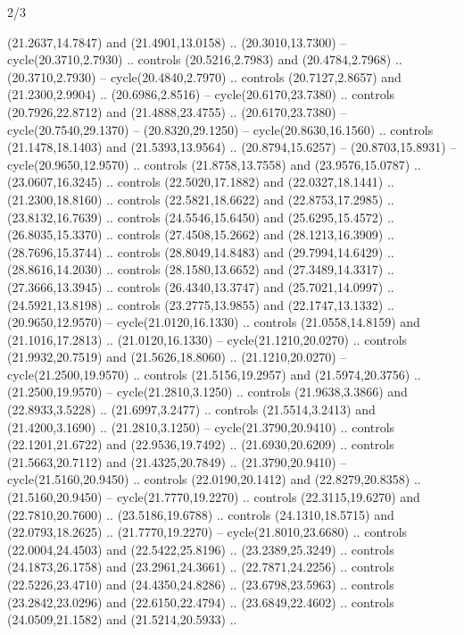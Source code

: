 \begin{flagdescription}{2/3}
\begin{scope}[yshift=\flagwidth,scale=\flagwidth/1241.93737]
\begin{scope}[y=-1mm, x=1mm,draw=gold,fill=blue,line join=miter,miter limit=4,line width=1.8\lw]
\begin{scope}[y=1mm, x=1mm, yscale=-1,shift={(573.68mm+\str,145.75)}]
\begin{scope}[scale=1.35,shift={(-9,-3)}]
\begin{scope}[scale=0.55]
\begin{scope}[scale=1.333]
    (21.2637,14.7847) and (21.4901,13.0158) .. (20.3010,13.7300) --
    cycle(20.3710,2.7930) .. controls (20.5216,2.7983) and (20.4784,2.7968) ..
    (20.3710,2.7930) -- cycle(20.4840,2.7970) .. controls (20.7127,2.8657) and
    (21.2300,2.9904) .. (20.6986,2.8516) -- cycle(20.6170,23.7380) .. controls
    (20.7926,22.8712) and (21.4888,23.4755) .. (20.6170,23.7380) --
    cycle(20.7540,29.1370) -- (20.8320,29.1250) -- cycle(20.8630,16.1560) ..
    controls (21.1478,18.1403) and (21.5393,13.9564) .. (20.8794,15.6257) --
    (20.8703,15.8931) -- cycle(20.9650,12.9570) .. controls (21.8758,13.7558) and
    (23.9576,15.0787) .. (23.0607,16.3245) .. controls (22.5020,17.1882) and
    (22.0327,18.1441) .. (21.2300,18.8160) .. controls (22.5821,18.6622) and
    (22.8753,17.2985) .. (23.8132,16.7639) .. controls (24.5546,15.6450) and
    (25.6295,15.4572) .. (26.8035,15.3370) .. controls (27.4508,15.2662) and
    (28.1213,16.3909) .. (28.7696,15.3744) .. controls (28.8049,14.8483) and
    (29.7994,14.6429) .. (28.8616,14.2030) .. controls (28.1580,13.6652) and
    (27.3489,14.3317) .. (27.3666,13.3945) .. controls (26.4340,13.3747) and
    (25.7021,14.0997) .. (24.5921,13.8198) .. controls (23.2775,13.9855) and
    (22.1747,13.1332) .. (20.9650,12.9570) -- cycle(21.0120,16.1330) .. controls
    (21.0558,14.8159) and (21.1016,17.2813) .. (21.0120,16.1330) --
    cycle(21.1210,20.0270) .. controls (21.9932,20.7519) and (21.5626,18.8060) ..
    (21.1210,20.0270) -- cycle(21.2500,19.9570) .. controls (21.5156,19.2957) and
    (21.5974,20.3756) .. (21.2500,19.9570) -- cycle(21.2810,3.1250) .. controls
    (21.9638,3.3866) and (22.8933,3.5228) .. (21.6997,3.2477) .. controls
    (21.5514,3.2413) and (21.4200,3.1690) .. (21.2810,3.1250) --
    cycle(21.3790,20.9410) .. controls (22.1201,21.6722) and (22.9536,19.7492) ..
    (21.6930,20.6209) .. controls (21.5663,20.7112) and (21.4325,20.7849) ..
    (21.3790,20.9410) -- cycle(21.5160,20.9450) .. controls (22.0190,20.1412) and
    (22.8279,20.8358) .. (21.5160,20.9450) -- cycle(21.7770,19.2270) .. controls
    (22.3115,19.6270) and (22.7810,20.7600) .. (23.5186,19.6788) .. controls
    (24.1310,18.5715) and (22.0793,18.2625) .. (21.7770,19.2270) --
    cycle(21.8010,23.6680) .. controls (22.0004,24.4503) and (22.5422,25.8196) ..
    (23.2389,25.3249) .. controls (24.1873,26.1758) and (23.2961,24.3661) ..
    (22.7871,24.2256) .. controls (22.5226,23.4710) and (24.4350,24.8286) ..
    (23.6798,23.5963) .. controls (23.2842,23.0296) and (22.6150,22.4794) ..
    (23.6849,22.4602) .. controls (24.0509,21.1582) and (21.5214,20.5933) ..

\end{scope}
\end{scope}
\end{scope}
\end{scope}
\end{scope}
\end{scope}
\end{flagdescription}
